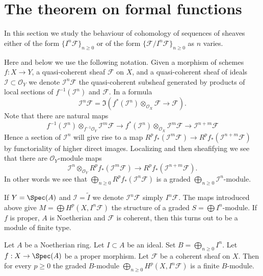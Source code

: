 \section{The theorem on formal functions}
\label{section-theorem-formal-functions}

\noindent
In this section we study the behaviour of cohomology of
sequences of sheaves either of the form $\{I^n\mathcal{F}\}_{n \geq 0}$
or of the form $\{\mathcal{F}/I^n\mathcal{F}\}_{n \geq 0}$ as
$n$ varies.

\medskip\noindent
Here and below we use the following notation.
Given a morphism of schemes $f : X \to Y$, a quasi-coherent sheaf
$\mathcal{F}$ on $X$, and a quasi-coherent sheaf of ideals
$\mathcal{I} \subset \mathcal{O}_Y$ we denote
$\mathcal{I}^n\mathcal{F}$ the quasi-coherent subsheaf generated
by products of local sections of $f^{-1}(\mathcal{I}^n)$ and
$\mathcal{F}$. In a formula
$$
\mathcal{I}^n\mathcal{F}
=
\Im\left(
f^*(\mathcal{I}^n) \otimes_{\mathcal{O}_X} \mathcal{F}
\longrightarrow
\mathcal{F}
\right).
$$
Note that there are natural maps
$$
f^{-1}(\mathcal{I}^n) \otimes_{f^{-1}\mathcal{O}_Y} \mathcal{I}^m\mathcal{F}
\longrightarrow
f^*(\mathcal{I}^n) \otimes_{\mathcal{O}_X} \mathcal{I}^m\mathcal{F}
\longrightarrow
\mathcal{I}^{n + m}\mathcal{F}
$$
Hence a section of $\mathcal{I}^n$ will give rise to a
map $R^pf_*(\mathcal{I}^m\mathcal{F}) \to
R^pf_*(\mathcal{I}^{n + m}\mathcal{F})$ by functoriality
of higher direct images. Localizing and then sheafifying we
see that there are $\mathcal{O}_Y$-module maps
$$
\mathcal{I}^n \otimes_{\mathcal{O}_Y} R^pf_*(\mathcal{I}^m\mathcal{F})
\longrightarrow
R^pf_*(\mathcal{I}^{n + m}\mathcal{F}).
$$
In other words we see that
$\bigoplus_{n \geq 0} R^pf_*(\mathcal{I}^n\mathcal{F})$
is a graded $\bigoplus_{n \geq 0} \mathcal{I}^n$-module.

\medskip\noindent
If $Y = \Spec(A)$ and $\mathcal{I} = \widetilde{I}$ we denote
$\mathcal{I}^n\mathcal{F}$ simply $I^n\mathcal{F}$. The maps
introduced above give $M = \bigoplus H^p(X, I^n\mathcal{F})$ the
structure of a graded $S = \bigoplus I^n$-module. If $f$ is proper,
$A$ is Noetherian and $\mathcal{F}$ is coherent, then this turns out
to be a module of finite type.

\begin{lemma}
\label{lemma-cohomology-powers-ideal-times-F}
\begin{reference}
\cite[III Cor 3.3.2]{EGA}
\end{reference}
Let $A$ be a Noetherian ring.
Let $I \subset A$ be an ideal.
Set $B = \bigoplus_{n \geq 0} I^n$.
Let $f : X \to \Spec(A)$ be a proper morphism.
Let $\mathcal{F}$ be a coherent sheaf on $X$.
Then for every $p \geq 0$ the graded $B$-module
$\bigoplus_{n \geq 0} H^p(X, I^n\mathcal{F})$ is
a finite $B$-module.
\end{lemma}

